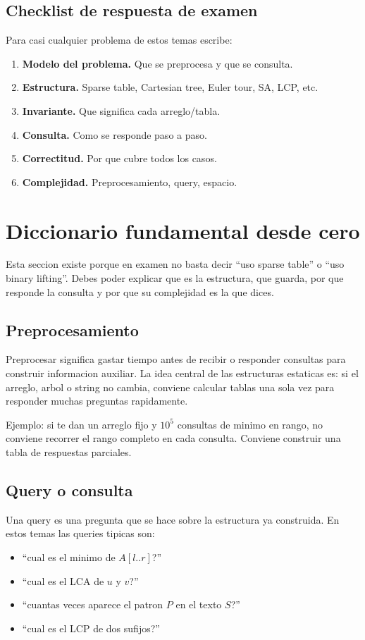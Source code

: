 \documentclass[10pt]{article}
\begin{document}
\subsection{Checklist de respuesta de examen}
Para casi cualquier problema de estos temas escribe:
\begin{enumerate}[leftmargin=*]
\item \textbf{Modelo del problema.} Que se preprocesa y que se consulta.
\item \textbf{Estructura.} Sparse table, Cartesian tree, Euler tour, SA, LCP, etc.
\item \textbf{Invariante.} Que significa cada arreglo/tabla.
\item \textbf{Consulta.} Como se responde paso a paso.
\item \textbf{Correctitud.} Por que cubre todos los casos.
\item \textbf{Complejidad.} Preprocesamiento, query, espacio.
\end{enumerate}

\newpage
\section{Diccionario fundamental desde cero}

Esta seccion existe porque en examen no basta decir ``uso sparse table'' o
``uso binary lifting''. Debes poder explicar que es la estructura, que guarda,
por que responde la consulta y por que su complejidad es la que dices.

\subsection{Preprocesamiento}
Preprocesar significa gastar tiempo antes de recibir o responder consultas para
construir informacion auxiliar. La idea central de las estructuras estaticas es:
si el arreglo, arbol o string no cambia, conviene calcular tablas una sola vez
para responder muchas preguntas rapidamente.

Ejemplo: si te dan un arreglo fijo y $10^5$ consultas de minimo en rango, no
conviene recorrer el rango completo en cada consulta. Conviene construir una
tabla de respuestas parciales.

\subsection{Query o consulta}
Una query es una pregunta que se hace sobre la estructura ya construida. En
estos temas las queries tipicas son:
\begin{itemize}[leftmargin=*]
\item ``cual es el minimo de $A[l..r]$?''
\item ``cual es el LCA de $u$ y $v$?''
\item ``cuantas veces aparece el patron $P$ en el texto $S$?''
\item ``cual es el LCP de dos sufijos?''
\end{itemize}
\end{document}
